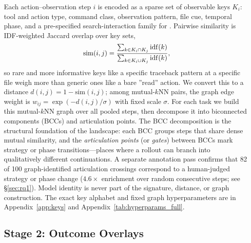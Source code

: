 Each action--observation step $i$ is encoded as a sparse set of observable keys $K_i$: tool and action type, command class, observation pattern, file cue, temporal phase, and a pre-specified search-interaction family for \searchb{}.
Pairwise similarity is IDF-weighted Jaccard overlap over key sets,
\begin{equation}
\mathrm{sim}(i,j)=\frac{\sum_{k\in K_i\cap K_j}\mathrm{idf}(k)}{\sum_{k\in K_i\cup K_j}\mathrm{idf}(k)},
\label{eq:sim}
\end{equation}
so rare and more informative keys like a specific traceback pattern at a specific file weigh more than generic ones like a bare ''read'' action.
We convert this to a distance $d(i,j)=1-\mathrm{sim}(i,j)$; among mutual-$k$NN pairs, the graph edge weight is $w_{ij}=\exp(-d(i,j)/\sigma)$ with fixed scale $\sigma$.
For each task we build this mutual-$k$NN graph over all pooled steps, then decompose it into biconnected components (BCCs) and articulation points.
The BCC decomposition is the structural foundation of the landscape: each BCC groups steps that share dense mutual similarity, and the \emph{articulation points} (or \emph{gates}) between BCCs mark strategy or phase transitions---places where a rollout can branch into qualitatively different continuations.
A separate annotation pass confirms that 82 of 100 graph-identified articulation crossings correspond to a human-judged strategy or phase change ($4.6\times$ enrichment over random consecutive steps; see \S\ref{sec:rq1}).
Model identity is never part of the signature, distance, or graph construction.
The exact key alphabet and fixed graph hyperparameters are in Appendix~\ref{app:keys} and Appendix~\ref{tab:hyperparams_full}.

\subsection{Stage 2: Outcome Overlays}
\label{sec:overlays}

